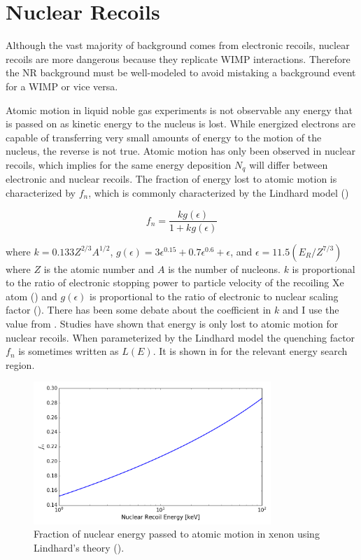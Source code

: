 \section{Nuclear Recoils}
\label{sec:nr}
Although the vast majority of background comes from electronic recoils, nuclear recoils are more dangerous because they replicate
WIMP interactions.  Therefore the NR background must be well-modeled to avoid mistaking a background event for a WIMP or vice
versa.

\noindent Atomic motion in liquid noble gas experiments is not observable any energy that is passed on as kinetic energy to the nucleus
is lost.  While energized electrons are capable of transferring very small
amounts of energy to the motion of the nucleus, the reverse is not true.  Atomic motion has only been observed in nuclear recoils,
which implies for the same energy deposition $N_{q}$ will differ between electronic and nuclear recoils.  The fraction of energy lost
to atomic motion is characterized by $f_{n}$, which is commonly characterized by the Lindhard model
()

\begin{equation}
f_{n} = \frac{k g(\epsilon)}{1 + k g(\epsilon)}
\label{eq:linhard_quenching}
\end{equation}

\noindent where $k = 0.133Z^{2/3}A^{1/2}$, $g(\epsilon) = 3\epsilon^{0.15} + 0.7\epsilon^{0.6} + \epsilon$, and
$\epsilon = 11.5 (E_{R} / Z^{7/3})$ where $Z$ is the atomic number and $A$ is the number of nucleons.  $k$ is proportional to the ratio of
electronic stopping power to particle velocity of the recoiling Xe atom () and $g(\epsilon)$ is proportional
to the ratio of electronic to nuclear scaling factor ().  There has been some debate about
the coefficient in $k$ and I use the value from .  Studies have shown that energy is only lost to atomic motion for
nuclear recoils.  When parameterized by the Lindhard model the quenching factor $f_{n}$ is sometimes written as $L(E)$.  It is
shown in  for the relevant energy search region.

\begin{figure}
\includegraphics[width=0.8\textwidth]{Lindhard}
\caption{Fraction of nuclear energy passed to atomic motion in xenon using Lindhard's theory ().}
\label{fig:lindhard}
\end{figure}

